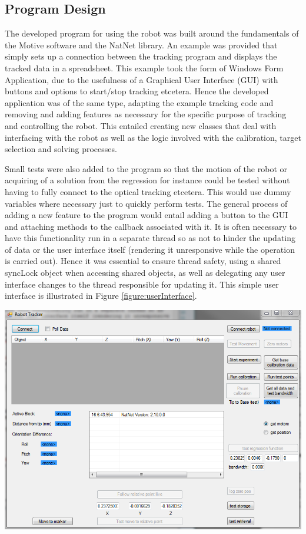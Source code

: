\documentclass[11pt]{article}
\begin{document}
\subsection{Program Design}
The developed program for using the robot was built around the fundamentals of the Motive software and the NatNet library. An example was provided that simply sets up a connection between the tracking program and displays the tracked data in a spreadsheet. This example took the form of Windows Form Application, due to the usefulness of a Graphical User Interface (GUI) with buttons and options to start/stop tracking etcetera. Hence the developed application was of the same type, adapting the example tracking code and removing and adding features as necessary for the specific purpose of tracking and controlling the robot. This entailed creating new classes that deal with interfacing with the robot as well as the logic involved with the calibration, target selection and solving processes. 

Small tests were also added to the program so that the motion of the robot or acquiring of a solution from the regression for instance could be tested without having to fully connect to the optical tracking etcetera. This would use dummy variables where necessary just to quickly perform tests. The general process of adding a new feature to the program would entail adding a button to the GUI and attaching methods to the callback associated with it. It is often necessary to have this functionality run in a separate thread so as not to hinder the updating of data or the user interface itself (rendering it unresponsive while the operation is carried out). Hence it was essential to ensure thread safety, using a shared syncLock object when accessing shared objects, as well as delegating any user interface changes to the thread responsible for updating it. This simple user interface is illustrated in Figure \ref{figure:userInterface}.

\begin{center}
\includegraphics[width=\textwidth]{images/userInterface.png}
\label{figure:userInterface}
\end{center}
\end{document}
